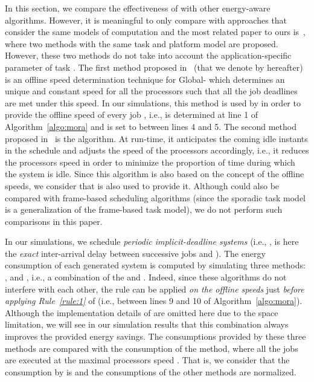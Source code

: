 \documentclass[times, 10pt,twocolumn]{article}
\begin{document}
\label{sec:experiments}

In this section, we compare the effectiveness of  with other energy-aware algorithms. However, it is meaningful to only compare  with approaches that consider the same models of computation and the most related paper to ours is~\cite{Nelis:08}, where two methods with the same task and platform model are proposed. However, these two methods do not take into account the application-specific parameter  of task . The first method proposed in~\cite{Nelis:08} (that we denote by  hereafter) is an offline speed determination technique for Global- which determines an unique and constant speed  for all the processors such that all the job deadlines are met under this speed. In our simulations, this  method is used by  in order to provide the offline speed  of every job , i.e.,  is determined at line 1 of Algorithm~\ref{algo:mora} and  is set to  between lines 4 and 5. The second method proposed in~\cite{Nelis:08} is the  algorithm. At run-time, it anticipates the coming idle instants in the schedule and adjusts the speed of the processors accordingly, i.e., it reduces the processors speed in order to minimize the proportion of time during which the system is idle. Since this algorithm is also based on the concept of the offline speeds, we consider that  is also used to provide it. Although  could also be compared with frame-based scheduling algorithms (since the sporadic task model is a generalization of the frame-based task model), we do not perform such comparisons in this paper.

In our simulations, we schedule \emph{periodic implicit-deadline systems} (i.e., ,  is here the \emph{exact} inter-arrival delay between successive jobs and ). The energy consumption of each generated system is computed by simulating three methods: ,  and , i.e., a combination of the  and . Indeed, since these algorithms do not interfere with each other, the  rule can be applied \emph{on the offline speeds} just \emph{before applying Rule~\ref{rule:1}} of  (i.e., between lines 9 and 10 of Algorithm~\ref{algo:mora}). Although the implementation details of  are omitted here due to the space limitation, we will see in our simulation results that this combination always improves the provided energy savings. The consumptions provided by these three methods are compared with the consumption of the  method, where all the jobs are executed at the maximal processors speed . That is, we consider that the consumption by  is  and the consumptions of the other methods are normalized.
\end{document}
